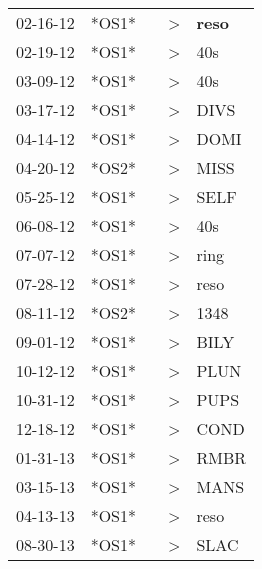 \begin{supertabular}{p{0.07\textwidth}p{0.06\textwidth}p{0.02\textwidth}p{0.02\textwidth}p{0.06\textwidth}}
 02-16-12\textsuperscript{} &  *OS1* &   &  \textgreater &  \textbf{reso\textsuperscript{}} \\
 02-19-12\textsuperscript{} &  *OS1* &   &  \textgreater &            40s\textsuperscript{} \\
 03-09-12\textsuperscript{} &  *OS1* &   &  \textgreater &            40s\textsuperscript{} \\
 03-17-12\textsuperscript{} &  *OS1* &   &  \textgreater &           DIVS\textsuperscript{} \\
 04-14-12\textsuperscript{} &  *OS1* &   &  \textgreater &           DOMI\textsuperscript{} \\
 04-20-12\textsuperscript{} &  *OS2* &   &  \textgreater &           MISS\textsuperscript{} \\
 05-25-12\textsuperscript{} &  *OS1* &   &  \textgreater &           SELF\textsuperscript{} \\
 06-08-12\textsuperscript{} &  *OS1* &   &  \textgreater &            40s\textsuperscript{} \\
 07-07-12\textsuperscript{} &  *OS1* &   &  \textgreater &           ring\textsuperscript{} \\
 07-28-12\textsuperscript{} &  *OS1* &   &  \textgreater &           reso\textsuperscript{} \\
 08-11-12\textsuperscript{} &  *OS2* &   &  \textgreater &           1348\textsuperscript{} \\
 09-01-12\textsuperscript{} &  *OS1* &   &  \textgreater &           BILY\textsuperscript{} \\
 10-12-12\textsuperscript{} &  *OS1* &   &  \textgreater &           PLUN\textsuperscript{} \\
 10-31-12\textsuperscript{} &  *OS1* &   &  \textgreater &           PUPS\textsuperscript{} \\
 12-18-12\textsuperscript{} &  *OS1* &   &  \textgreater &           COND\textsuperscript{} \\
 01-31-13\textsuperscript{} &  *OS1* &   &  \textgreater &           RMBR\textsuperscript{} \\
 03-15-13\textsuperscript{} &  *OS1* &   &  \textgreater &           MANS\textsuperscript{} \\
 04-13-13\textsuperscript{} &  *OS1* &   &  \textgreater &           reso\textsuperscript{} \\
 08-30-13\textsuperscript{} &  *OS1* &   &  \textgreater &           SLAC\textsuperscript{} \\

\end{supertabular}
